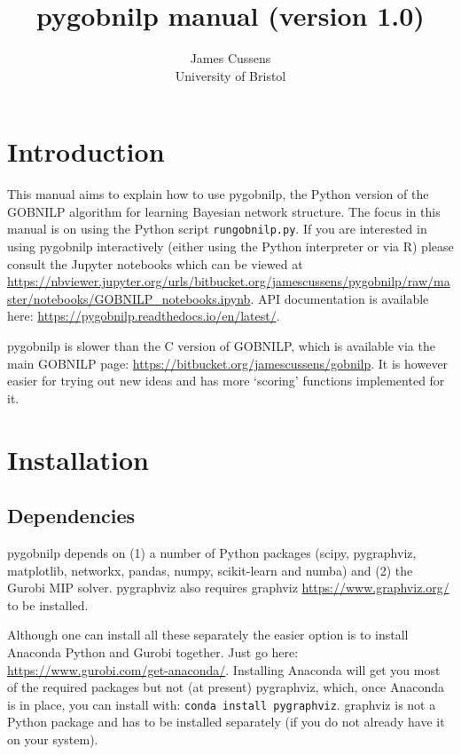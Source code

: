\documentclass{article}
\title{pygobnilp manual (version 1.0)}
\author{James Cussens\\University of Bristol}
\newcommand{\pygobnilp}{\textsf{pygobnilp}}
\begin{document}
\maketitle

\tableofcontents

\section{Introduction}
\label{sec:intro}

This manual aims to explain how to use \pygobnilp{}, the Python
version of the GOBNILP algorithm for learning Bayesian network
structure. The focus in this manual is on using the Python script
\texttt{rungobnilp.py}. If you are interested in using \pygobnilp{}
interactively (either using the Python interpreter or via R) please
consult the Jupyter notebooks which can be viewed at
\url{https://nbviewer.jupyter.org/urls/bitbucket.org/jamescussens/pygobnilp/raw/master/notebooks/GOBNILP_notebooks.ipynb}.
API documentation is available here:
\url{https://pygobnilp.readthedocs.io/en/latest/}.

\pygobnilp{} is slower than the C version of GOBNILP, which is
available via the main GOBNILP page:
\url{https://bitbucket.org/jamescussens/gobnilp}. It is however easier for
trying out new ideas and has more `scoring' functions implemented for it.

\section{Installation}
\label{sec:installation}

\subsection{Dependencies}
\label{sec:dependencies}

\pygobnilp{} depends on (1) a number of Python packages (scipy,
pygraphviz, matplotlib, networkx, pandas, numpy, scikit-learn and
numba) and (2) the Gurobi MIP solver. pygraphviz also requires
graphviz \url{https://www.graphviz.org/} to be installed.

Although one can install all these separately the easier option is to
install Anaconda Python and Gurobi together. Just go here:
\url{https://www.gurobi.com/get-anaconda/}. Installing Anaconda will
get you most of the required packages but not (at present) pygraphviz,
which, once Anaconda is in place, you can install with: \texttt{conda
  install pygraphviz}. graphviz is not a Python package and has to be
installed separately (if you do not already have it on your system).
\end{document}

